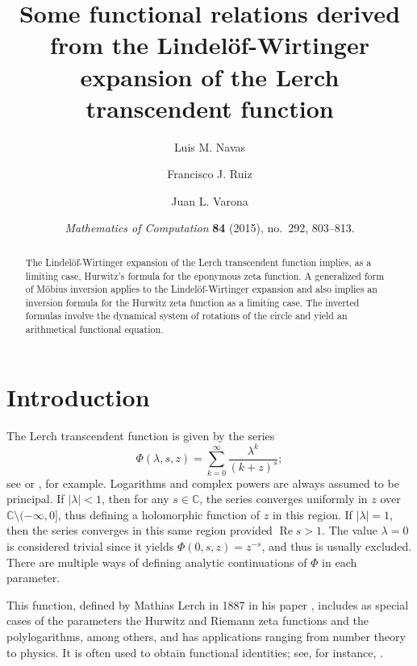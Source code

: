 \documentclass[11pt,a4paper,reqno]{amsart}
\date{\textit{Mathematics of Computation} \textbf{84} (2015), no.~292, 803--813.}
\title[Functional relations from the Lindel\"of-Wirtinger expansion]%
{Some functional relations derived from the Lindel\"of-Wirtinger expansion of the Lerch transcendent function}
\author[L.~M.~Navas]{Luis M. Navas}
\author[F.~J.~Ruiz]{Francisco J. Ruiz}
\author[J.~L.~Varona]{Juan L. Varona}
\newcommand{\C}{\mathbb{C}}
\renewcommand{\Re}{\operatorname{Re}}
\theoremstyle{plain}
\theoremstyle{remark}
\numberwithin{equation}{section}
\begin{document}


\begin{abstract}
The Lindel\"of-Wirtinger expansion of the Lerch transcendent function implies, as a limiting case, Hurwitz's formula for the eponymous zeta function. A generalized form of M\"obius inversion applies to the Lindel\"of-Wirtinger expansion and also implies an inversion formula for the Hurwitz zeta function as a limiting case. The inverted formulas involve the dynamical system of rotations of the circle and yield an arithmetical functional equation.
\end{abstract}

\maketitle

\section{Introduction}
\label{sec:intro}


The Lerch transcendent function is given by the series
%
\begin{equation}
\label{eq:Lerch}
  \Phi(\lambda,s,z) = \sum_{k=0}^\infty\frac{\lambda^k}{(k+z)^s};
\end{equation}
%
see \cite[\S1.11, p.~27]{Bate} or \cite[\S25.14]{Ap-NIST}, for example.
Logarithms and complex powers are always assumed to be principal.
If $|\lambda| < 1$, then for any $s \in \C$, the series converges uniformly in $z$ over  $\C \setminus (-\infty,0]$, thus defining a holomorphic function of $z$ in this region. If $|\lambda| = 1$, then the series converges in this same region provided $\Re s > 1$. The value $\lambda = 0$ is considered trivial since it yields $\Phi(0,s,z) = z^{-s}$, and thus is usually excluded. There are multiple ways of defining analytic continuations of $\Phi$ in each parameter.

This function, defined by Mathias Lerch in 1887 in his paper \cite{Lerch},
includes as special cases of the parameters the Hurwitz and Riemann zeta functions
and the polylogarithms, among others, and has applications ranging from number theory to physics. It is often used to obtain functional identities; see, for instance, \cite{BaSa, Boy, GuiS, SC-book}.
\end{document}
